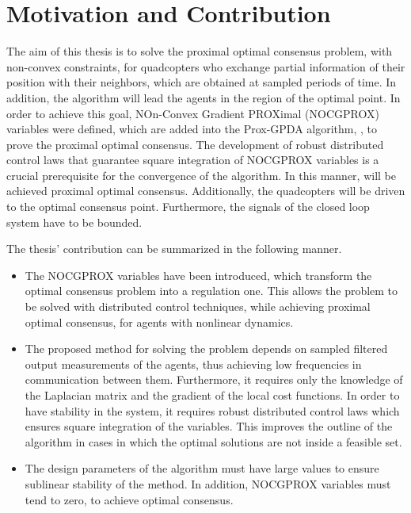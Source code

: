 \section{Motivation and Contribution}

The aim of this thesis is to solve the proximal optimal consensus problem, with non-convex constraints, for quadcopters who exchange partial information of their position with their neighbors, which are obtained at sampled periods of time. In addition, the algorithm will lead the agents in the region of the optimal point. In order to achieve this goal, NOn-Convex Gradient PROXimal (NOCGPROX) variables were defined, which are added into the Prox-GPDA algorithm, \cite{pmlr-v70-hong17a}, to prove the proximal optimal consensus. The development of robust distributed control laws that guarantee square integration of NOCGPROX variables is a crucial prerequisite for the convergence of the algorithm. In this manner, will be achieved proximal optimal consensus. Additionally, the quadcopters will be driven to the optimal consensus point. Furthermore, the signals of the closed loop system have to be bounded.

The thesis' contribution can be summarized in the following manner.

    \begin{itemize}
        \item  The NOCGPROX variables have been introduced, which transform the optimal consensus problem into a regulation one. This allows the problem to be solved with distributed control techniques, while achieving proximal optimal consensus, for agents with nonlinear dynamics.
        \item The proposed method for solving the problem depends on sampled filtered output measurements of the agents, thus achieving low frequencies in communication between them. Furthermore, it requires only the knowledge of the Laplacian matrix and the gradient of the local cost functions. In order to have stability in the system, it requires robust distributed control laws which ensures square integration of the variables. This improves the outline of the algorithm in cases in which the optimal solutions are not inside a feasible set.
        \item The design parameters of the algorithm must have large values to ensure sublinear stability of the method. In addition, NOCGPROX variables must tend to zero, to achieve optimal consensus.
    \end{itemize}


